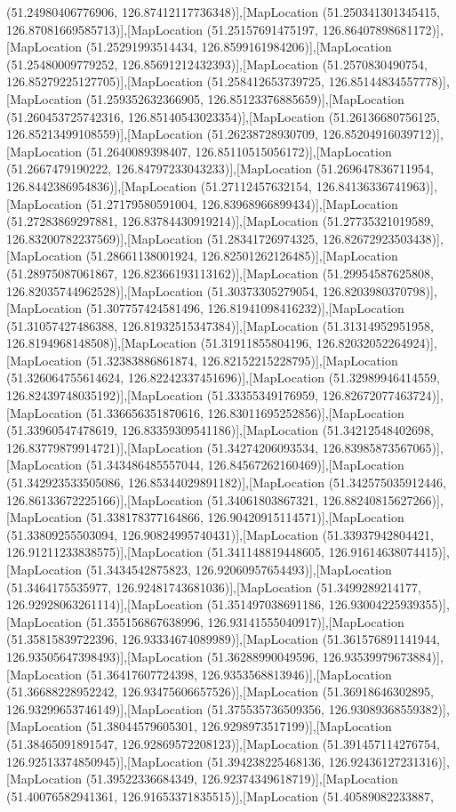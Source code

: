 (51.24980406776906, 126.87412117736348)],[MapLocation (51.250341301345415, 126.87081669585713)],[MapLocation (51.25157691475197, 126.86407898681172)],[MapLocation (51.25291993514434, 126.8599161984206)],[MapLocation (51.25480009779252, 126.85691212432393)],[MapLocation (51.2570830490754, 126.85279225127705)],[MapLocation (51.258412653739725, 126.85144834557778)],[MapLocation (51.259352632366905, 126.85123376885659)],[MapLocation (51.260453725742316, 126.85140543023354)],[MapLocation (51.26136680756125, 126.85213499108559)],[MapLocation (51.26238728930709, 126.85204916039712)],[MapLocation (51.2640089398407, 126.85110515056172)],[MapLocation (51.2667479190222, 126.84797233043233)],[MapLocation (51.269647836711954, 126.8442386954836)],[MapLocation (51.27112457632154, 126.84136336741963)],[MapLocation (51.27179580591004, 126.83968966899434)],[MapLocation (51.27283869297881, 126.83784430919214)],[MapLocation (51.27735321019589, 126.83200782237569)],[MapLocation (51.28341726974325, 126.82672923503438)],[MapLocation (51.28661138001924, 126.82501262126485)],[MapLocation (51.28975087061867, 126.82366193113162)],[MapLocation (51.29954587625808, 126.82035744962528)],[MapLocation (51.30373305279054, 126.8203980370798)],[MapLocation (51.307757424581496, 126.81941098416232)],[MapLocation (51.31057427486388, 126.81932515347384)],[MapLocation (51.31314952951958, 126.8194968148508)],[MapLocation (51.31911855804196, 126.82032052264924)],[MapLocation (51.32383886861874, 126.82152215228795)],[MapLocation (51.326064755614624, 126.82242337451696)],[MapLocation (51.32989946414559, 126.82439748035192)],[MapLocation (51.33355349176959, 126.82672077463724)],[MapLocation (51.336656351870616, 126.83011695252856)],[MapLocation (51.33960547478619, 126.83359309541186)],[MapLocation (51.34212548402698, 126.83779879914721)],[MapLocation (51.34274206093534, 126.83985873567065)],[MapLocation (51.343486485557044, 126.84567262160469)],[MapLocation (51.342923533505086, 126.85344029891182)],[MapLocation (51.342575035912446, 126.86133672225166)],[MapLocation (51.34061803867321, 126.88240815627266)],[MapLocation (51.338178377164866, 126.90420915114571)],[MapLocation (51.33809255503094, 126.90824995740431)],[MapLocation (51.33937942804421, 126.91211233838575)],[MapLocation (51.341148819448605, 126.91614638074415)],[MapLocation (51.3434542875823, 126.92060957654493)],[MapLocation (51.3464175535977, 126.92481743681036)],[MapLocation (51.3499289214177, 126.92928063261114)],[MapLocation (51.351497038691186, 126.93004225939355)],[MapLocation (51.355156867638996, 126.93141555040917)],[MapLocation (51.35815839722396, 126.93334674089989)],[MapLocation (51.361576891141944, 126.93505647398493)],[MapLocation (51.36288990049596, 126.93539979673884)],[MapLocation (51.36417607724398, 126.9353568813946)],[MapLocation (51.36688228952242, 126.93475606657526)],[MapLocation (51.36918646302895, 126.93299653746149)],[MapLocation (51.375535736509356, 126.93089368559382)],[MapLocation (51.38044579605301, 126.9298973517199)],[MapLocation (51.38465091891547, 126.92869572208123)],[MapLocation (51.391457114276754, 126.92513374850945)],[MapLocation (51.394238225468136, 126.92436127231316)],[MapLocation (51.39522336684349, 126.92374349618719)],[MapLocation (51.40076582941361, 126.91653371835515)],[MapLocation (51.40589082233887, 